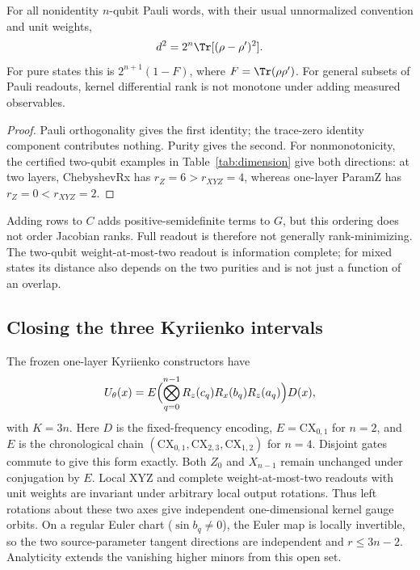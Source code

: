 \begin{proposition}
\label{prop:IC}
For all nonidentity $n$-qubit Pauli words, with their usual
unnormalized convention and unit weights,
\begin{equation}
 d^2=2^n\Tr[(\rho-\rho')^2].
\end{equation}
For pure states this is $2^{n+1}(1-F)$, where $F=\Tr(\rho\rho')$.
For general subsets of Pauli readouts, kernel differential rank is
not monotone under adding measured observables.
\end{proposition}
\begin{proof}
Pauli orthogonality gives the first identity; the trace-zero identity
component contributes nothing. Purity gives the second. For
nonmonotonicity, the certified two-qubit examples in
Table~\ref{tab:dimension} give both directions: at two layers,
ChebyshevRx has $r_Z=6>r_{XYZ}=4$, whereas one-layer ParamZ has
$r_Z=0<r_{XYZ}=2$.
\end{proof}
Adding rows to $C$ adds positive-semidefinite terms to $G$, but this
ordering does not order Jacobian ranks. Full readout is therefore not
generally rank-minimizing. The two-qubit weight-at-most-two readout
is information complete; for mixed states its distance also depends
on the two purities and is not just a function of an overlap.

\subsection{Closing the three Kyriienko intervals}
\label{sec:gramkyri}
The frozen one-layer Kyriienko constructors have
\begin{equation}
 U_\theta(x)=E\Bigl(\bigotimes_{q=0}^{n-1}
 R_z(c_q)R_x(b_q)R_z(a_q)\Bigr)D(x),\label{eq:kyriform}
\end{equation}
with $K=3n$. Here $D$ is the fixed-frequency encoding,
$E=\mathrm{CX}_{0,1}$ for $n=2$, and $E$ is the chronological
chain $(\mathrm{CX}_{0,1},\mathrm{CX}_{2,3},\mathrm{CX}_{1,2})$
for $n=4$. Disjoint gates commute to give this form exactly.
Both $Z_0$ and $X_{n-1}$ remain unchanged under conjugation by $E$.
Local XYZ and complete weight-at-most-two readouts with unit weights
are invariant under arbitrary local output rotations. Thus left
rotations about these two axes give independent one-dimensional
kernel gauge orbits. On a regular Euler chart ($\sin b_q\ne0$),
the Euler map is locally invertible, so the two source-parameter
tangent directions are independent and $r\le3n-2$.
Analyticity extends the vanishing higher minors from this open set.


